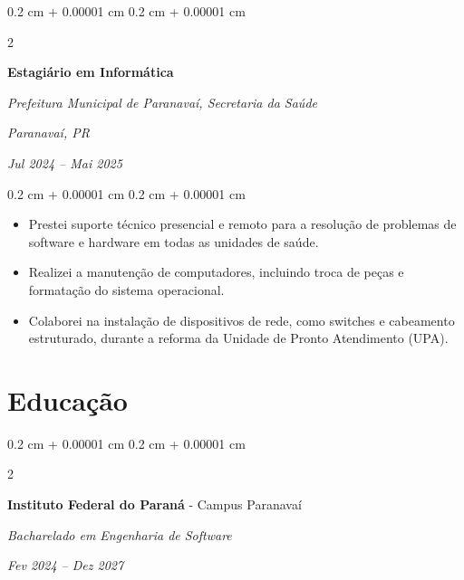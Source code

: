 \documentclass[10pt, letterpaper]{article}
\newenvironment{highlights}{
    \begin{itemize}[
        topsep=0.10 cm,
        parsep=0.10 cm,
        partopsep=0pt,
        itemsep=0pt,
        leftmargin=0.4 cm + 10pt
    ]
}{
    \end{itemize}
} %
\newenvironment{onecolentry}{
    \begin{adjustwidth}{
        0.2 cm + 0.00001 cm
    }{
        0.2 cm + 0.00001 cm
    }
}{
    \end{adjustwidth}
} %
\newenvironment{twocolentry}[2][]{
    \onecolentry
    \def\secondColumn{#2}
    \setcolumnwidth{\fill, 4.5 cm}
    \begin{paracol}{2}
}{
    \switchcolumn \raggedleft \secondColumn
    \end{paracol}
    \endonecolentry
} %
\begin{document}
        \begin{twocolentry}{
        \textit{Paranavaí, PR}    
            
        \textit{Jul 2024 – Mai 2025}}
            \textbf{Estagiário em Informática}
            
            \textit{Prefeitura Municipal de Paranavaí, Secretaria da Saúde}
        \end{twocolentry}

        \vspace{0.10 cm}
        
        \begin{onecolentry}
            \begin{highlights}
                \item Prestei suporte técnico presencial e remoto para a resolução de problemas de software e hardware em todas as unidades de saúde.
                \item Realizei a manutenção de computadores, incluindo troca de peças e formatação do sistema operacional.
                \item Colaborei na instalação de dispositivos de rede, como switches e cabeamento estruturado, durante a reforma da Unidade de Pronto Atendimento (UPA).
            \end{highlights}
        \end{onecolentry}



    \section{Educação}


        \begin{twocolentry}{
                        
        \textit{Fev 2024 – Dez 2027}}
            \textbf{Instituto Federal do Paraná} - Campus Paranavaí

            \textit{Bacharelado em Engenharia de Software}
        \end{twocolentry}
    

                        
\end{document}

